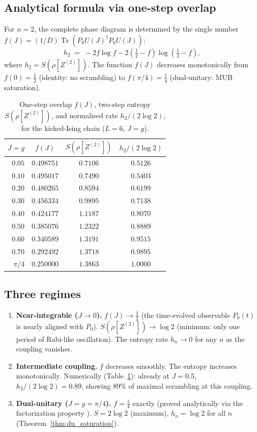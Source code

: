 \documentclass[12pt,a4paper]{article}
\begin{document}
\subsection{Analytical formula via one-step overlap}

For $n=2$, the complete phase diagram is determined by the single number
$f(J) = (1/D)\operatorname{Tr}(P_0 U(J)^{\dagger}P_0 U(J))$:
\[
  h_2 \;=\; -2f\log f - 2\!\left(\tfrac12-f\right)\!\log\!\left(\tfrac12-f\right),
\]
where $h_2 = S(\rho[Z^{(2)}])$.  The function $f(J)$ decreases monotonically
from $f(0)=\tfrac12$ (identity: no scrambling) to $f(\pi/4)=\tfrac14$
(dual-unitary: MUB saturation).

\begin{table}[h]
\centering
\caption{One-step overlap $f(J)$, two-step entropy $S(\rho[Z^{(2)}])$, and
normalised rate $h_2/(2\log 2)$, for the kicked-Ising chain ($L=6$, $J=g$).}
\begin{tabular}{r|ccc}
\hline
$J=g$ & $f(J)$ & $S(\rho[Z^{(2)}])$ & $h_2/(2\log 2)$\\
\hline
$0.05$ & $0.498751$ & $0.7106$ & $0.5126$ \\
$0.10$ & $0.495017$ & $0.7490$ & $0.5403$ \\
$0.20$ & $0.480265$ & $0.8594$ & $0.6199$ \\
$0.30$ & $0.456334$ & $0.9895$ & $0.7138$ \\
$0.40$ & $0.424177$ & $1.1187$ & $0.8070$ \\
$0.50$ & $0.385076$ & $1.2322$ & $0.8889$ \\
$0.60$ & $0.340589$ & $1.3191$ & $0.9515$ \\
$0.70$ & $0.292492$ & $1.3718$ & $0.9895$ \\
$\pi/4$ & $0.250000$ & $1.3863$ & $1.0000$ \\
\hline
\end{tabular}
\label{tab:phase_diagram}
\end{table}

\subsection{Three regimes}

\begin{enumerate}
\item \textbf{Near-integrable ($J\to 0$).}
$f(J)\to\tfrac12$ (the time-evolved observable $P_0(t)$ is nearly aligned
with $P_0$).  $S(\rho[Z^{(2)}])\to\log 2$ (minimum: only one period of
Rabi-like oscillation).  The entropy rate $h_n\to 0$ for any $n$ as the
coupling vanishes.

\item \textbf{Intermediate coupling.}
$f$ decreases smoothly.  The entropy increases monotonically.
Numerically (Table~\ref{tab:phase_diagram}): already at $J=0.5$,
$h_2/(2\log 2)=0.89$, showing $89\%$ of maximal scrambling at this coupling.

\item \textbf{Dual-unitary ($J=g=\pi/4$).}
$f=\tfrac14$ exactly (proved analytically via the factorization
property \cite{bertini2019}).  $S=2\log 2$ (maximum), $h_n=\log 2$
for all $n$ (Theorem~\ref{thm:du_saturation}).
\end{enumerate}
\end{document}
